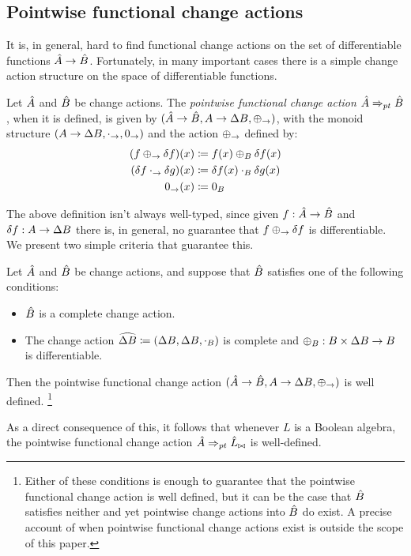 \subsection{Pointwise functional change actions}
\label{sec:pointwiseFunctional}

It is, in general, hard to find functional change actions on the set
of differentiable functions $\hat{A} \rightarrow \hat{B}$. Fortunately, 
in many important cases there is a simple change action structure on the space of differentiable 
functions.

\begin{defn}
  Let $\hat{A}$ and $\hat{B}$ be change actions. The \emph{pointwise functional change action} 
  $\hat{A} \Rightarrow_{pt} \hat{B}$, when it is defined,
  is given by $(\hat{A} \rightarrow \hat{B}, A \rightarrow \Delta B, \oplus_\rightarrow)$, with
  the monoid structure $(A \rightarrow \Delta B, \cdot_\rightarrow, 0_\rightarrow)$ and the action 
  $\oplus_\rightarrow$ defined by:
  \begin{align*}
    (f \oplus_\to \delta f)(x) &\coloneqq f(x) \oplus_B \delta f (x)\\
    (\delta f \cdot_\rightarrow \delta g)(x) &\coloneqq \delta f(x) \cdot_B \delta g(x)\\
    0_\rightarrow (x) &\coloneqq 0_B
  \end{align*}
\end{defn}

The above definition isn't always well-typed, since given $f : \hat{A} \rightarrow \hat{B}$ and
$\delta f : A \rightarrow \Delta B$ there is, in general, no guarantee that 
$f \oplus_\rightarrow \delta f$ is differentiable. We present two simple criteria that guarantee this.

\begin{thm}
  \label{thm:functionalCAct}
  Let $\hat{A}$ and $\hat{B}$ be change actions, and suppose that $\hat{B}$ satisfies one of the
  following conditions:
  \begin{itemize}
    \item $\hat{B}$ is a complete change action.
    \item The change action $\widehat {\Delta B} \coloneqq (\Delta B, \Delta B, \cdot_B)$ is 
      complete and 
      $\oplus_B : B \times \Delta B \to B$ is differentiable.
  \end{itemize}
  Then the pointwise functional change action 
  $(\hat{A} \rightarrow \hat{B}, A \rightarrow \Delta B, \oplus_\rightarrow)$ is well defined. 
  \footnote{
    Either of these conditions is enough to guarantee that the pointwise functional change action
    is well defined, but it can be the case that $\hat{B}$ satisfies neither and yet pointwise
    change actions into $\hat{B}$ do exist. A precise account of when pointwise functional change
    actions exist is outside the scope of this paper.
  }
\end{thm}
As a direct consequence of this, it follows that whenever $L$ is a Boolean algebra, the
pointwise functional change action $\hat{A} \Rightarrow_{pt} \hat{L}_{\bowtie}$ is well-defined.


